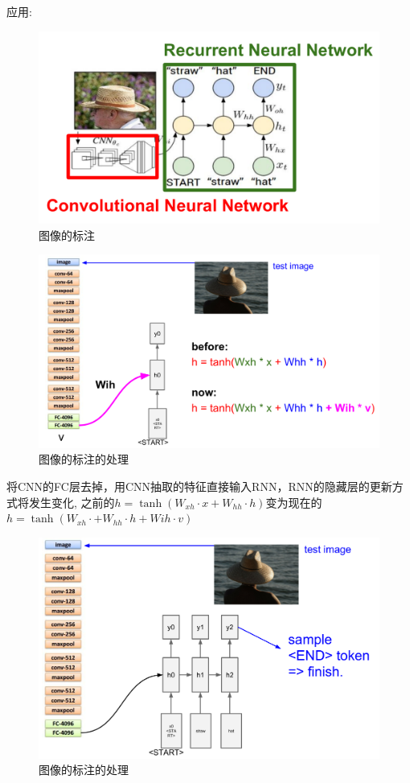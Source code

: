 \documentclass{article}
\begin{document}
应用:
\begin{figure}[H]
\centering
\includegraphics[scale=0.4]{figure/Image_Cap.PNG}
\caption{图像的标注}
\label{fig:11}
\end{figure}
\begin{figure}[H]
\centering
\includegraphics[scale=0.4]{figure/Image_Cap_Pro.PNG}
\caption{图像的标注的处理}
\label{fig:12}
\end{figure}
将CNN的FC层去掉，用CNN抽取的特征直接输入RNN，RNN的隐藏层的更新方式将发生变化,
之前的$h=\tanh(W_{xh}\cdot x+W_{hh}\cdot h)$变为现在的$h = \tanh(W_{xh}\cdot+W_{hh}\cdot h +W{ih}\cdot v)$
\begin{figure}[H]
\centering
\includegraphics[scale=0.4]{figure/Image_Cap_ProPre.PNG}
\caption{图像的标注的处理}
\label{fig:13}
\end{figure}
\end{document}
